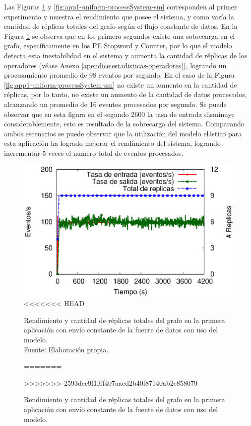 
Las Figuras \ref{fig:app1-uniform-processSystem-cm} y \ref{fig:app1-uniform-processSystem-sm} \normalsize{corresponden al primer experimento y muestra el rendimiento que posee el sistema, y como var\'ia la cantidad de r\'eplicas totales del grafo seg\'un el flujo constante de datos.} En la Figura \ref{fig:app1-uniform-processSystem-cm} \normalsize{se observa que en los primero segundos existe una sobrecarga en el grafo, espec\'ificamente en los PE Stopword y Counter, por lo que el modelo detecta esta inestabilidad en el sistema y aumenta la cantidad de r\'eplicas de los operadores} (v\'ease Anexo \ref{apendice:estadisticas-operadores}), \normalsize{logrando un procesamiento promedio de  98 eventos por segundo.} En el caso de la Figura \ref{fig:app1-uniform-processSystem-sm} \normalsize{no existe un aumento en la cantidad de r\'eplicas, por lo tanto, no existe un aumento de la cantidad de datos procesados, alcanzando un promedio de 16 eventos procesados por segundo. Se puede observar que en esta figura en el segundo 2600 la tasa de entrada disminuye considerablemente, esto es resultado de la sobrecarga del sistema. Comparando ambos escenarios se puede observar que la utilizaci\'on del modelo el\'astico para esta aplicaci\'on ha logrado mejorar el rendimiento del sistema, logrando incrementar 5 veces el numero total de eventos procesados.}

\begin{figure}[!ht]
	\centering
	\captionsetup{justification=centering}
	\includegraphics[scale=0.65]{images/exp/app1/uniform/cm/processSystem.eps}
<<<<<<< HEAD
    \caption[Rendimiento y cantidad de réplicas totales del grafo en la primera aplicación con envío constante de la fuente de datos con uso del modelo.]{Rendimiento y cantidad de réplicas totales del grafo en la primera aplicación con envío constante de la fuente de datos con uso del modelo.\\Fuente: Elaboración propia.}
=======
    \caption{Rendimiento y cantidad de r\'eplicas totales del grafo en la primera aplicaci\'on con env\'io constante de la fuente de datos con uso del modelo.}
>>>>>>> 2593dcc9f1f0f407aaed2b40f87140ab2e858079
	\label{fig:app1-uniform-processSystem-cm}
\end{figure}

